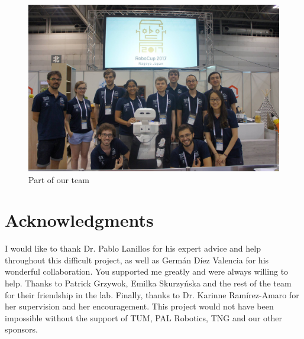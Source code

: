 \documentclass[a4paper, twocolumn]{article}
\begin{document}
    \begin{figure}[!b]
        \includegraphics[width=\columnwidth]{../img/team.jpg}
        \caption{Part of our team}
        \label{team}
    \end{figure}

    \section*{Acknowledgments}

    I would like to thank Dr. Pablo Lanillos for his expert advice and help throughout this difficult project, as well as Germ\'{a}n D\'{i}ez Valencia for his wonderful collaboration. You supported me greatly and were always willing to help. Thanks to Patrick Grzywok, Emilka Skurzy\'{n}ska and the rest of the team for their friendship in the lab. Finally, thanks to Dr. Karinne Ram\'{i}rez-Amaro for her supervision and her encouragement. This project would not have been impossible without the support of TUM, PAL Robotics, TNG and our other sponsors.

    \vfill


	\pagebreak

	\twocolumn[{\begin{@twocolumnfalse}
		
		
	\end{@twocolumnfalse}}]

    \appendixpageoff

    \begin{appendices}
        \centering\noindent
        

    \end{appendices}
\end{document}
